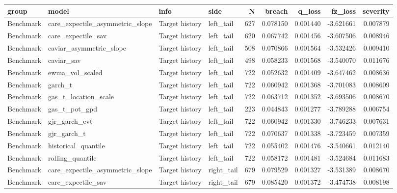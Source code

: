 \begin{tabular}{lll lrrrrr}
\toprule
group & model & info & side & N & breach & q_loss & fz_loss & severity \\
\midrule
Benchmark & care\_expectile\_asymmetric\_slope & Target history & left\_tail & 627 & 0.078150 & 0.001440 & -3.621661 & 0.007879 \\
Benchmark & care\_expectile\_sav & Target history & left\_tail & 620 & 0.067742 & 0.001456 & -3.607506 & 0.008946 \\
Benchmark & caviar\_asymmetric\_slope & Target history & left\_tail & 508 & 0.070866 & 0.001564 & -3.532426 & 0.009410 \\
Benchmark & caviar\_sav & Target history & left\_tail & 498 & 0.058233 & 0.001568 & -3.540070 & 0.011676 \\
Benchmark & ewma\_vol\_scaled & Target history & left\_tail & 722 & 0.052632 & 0.001409 & -3.647462 & 0.008636 \\
Benchmark & garch\_t & Target history & left\_tail & 722 & 0.060942 & 0.001368 & -3.701083 & 0.008609 \\
Benchmark & gas\_t\_location\_scale & Target history & left\_tail & 722 & 0.063712 & 0.001352 & -3.693506 & 0.008670 \\
Benchmark & gas\_t\_pot\_gpd & Target history & left\_tail & 223 & 0.044843 & 0.001277 & -3.789288 & 0.006754 \\
Benchmark & gjr\_garch\_evt & Target history & left\_tail & 722 & 0.060942 & 0.001330 & -3.746233 & 0.007631 \\
Benchmark & gjr\_garch\_t & Target history & left\_tail & 722 & 0.070637 & 0.001338 & -3.723459 & 0.007359 \\
Benchmark & historical\_quantile & Target history & left\_tail & 722 & 0.055402 & 0.001476 & -3.540661 & 0.012140 \\
Benchmark & rolling\_quantile & Target history & left\_tail & 722 & 0.058172 & 0.001481 & -3.524684 & 0.011683 \\
Benchmark & care\_expectile\_asymmetric\_slope & Target history & right\_tail & 679 & 0.079529 & 0.001327 & -3.531389 & 0.008670 \\
Benchmark & care\_expectile\_sav & Target history & right\_tail & 679 & 0.085420 & 0.001372 & -3.474738 & 0.008198 \\

\end{tabular}
